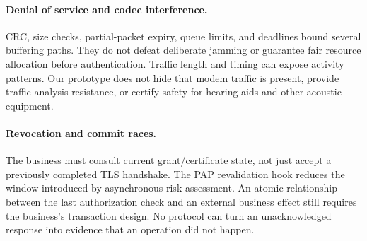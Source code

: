 \paragraph{Denial of service and codec interference.}
CRC, size checks, partial-packet expiry, queue limits, and deadlines bound
several buffering paths. They do not defeat deliberate jamming or guarantee
fair resource allocation before authentication. Traffic length and timing
can expose activity patterns. Our prototype does not hide that modem traffic
is present, provide traffic-analysis resistance, or certify safety for
hearing aids and other acoustic equipment.

\paragraph{Revocation and commit races.}
The business must consult current grant/certificate state, not just accept a
previously completed TLS handshake. The PAP revalidation hook reduces the
window introduced by asynchronous risk assessment. An atomic relationship
between the last authorization check and an external business effect still
requires the business's transaction design. No protocol can turn an
unacknowledged response into evidence that an operation did not happen.
